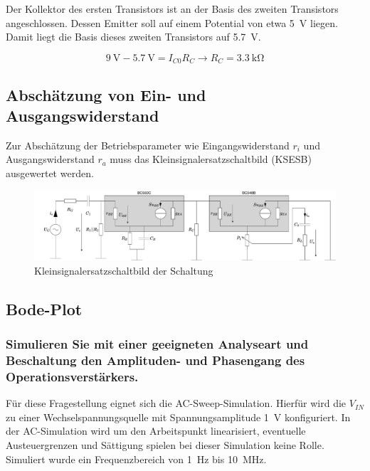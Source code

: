 Der Kollektor des ersten Transistors ist an der Basis des zweiten Transistors angeschlossen. Dessen Emitter soll auf einem Potential von etwa \SI{5}{\volt} liegen. Damit liegt die Basis dieses zweiten Transistors auf \SI{5.7}{\volt}.

\begin{equation*}
    \SI{9}{\volt} - \SI{5.7}{\volt} = I_{C0} R_C \rightarrow R_C = \SI{3.3}{\kilo \ohm}
\end{equation*}

\subsection{Abschätzung von Ein- und Ausgangswiderstand}

Zur Abschätzung der Betriebsparameter wie Eingangswiderstand $r_i$ und Ausgangswiderstand $r_a$ muss das Kleinsignalersatzschaltbild (KSESB) ausgewertet werden.

\begin{figure}[H]
    \centering
    \includegraphics[width = \textwidth]{tex/1_Microphone/pictures/KSESB.pdf}
    \caption{Kleinsignalersatzschaltbild der Schaltung}
    \label{fig:my_label}
\end{figure}

\subsection{Bode-Plot}
\subsubsection{Simulieren Sie mit einer geeigneten Analyseart und Beschaltung den Amplituden- und Phasengang des Operationsverstärkers.}

Für diese Fragestellung eignet sich die AC-Sweep-Simulation. Hierfür wird die $V_{IN}$ zu einer Wechselspannungsquelle mit Spannungsamplitude \SI{1}{\volt} konfiguriert. In der AC-Simulation wird um den Arbeitspunkt linearisiert, eventuelle Austeuergrenzen und Sättigung spielen bei dieser Simulation keine Rolle. Simuliert wurde ein Frequenzbereich von \SI{1}{Hz} bis \SI{10}{\mega \hertz}.

